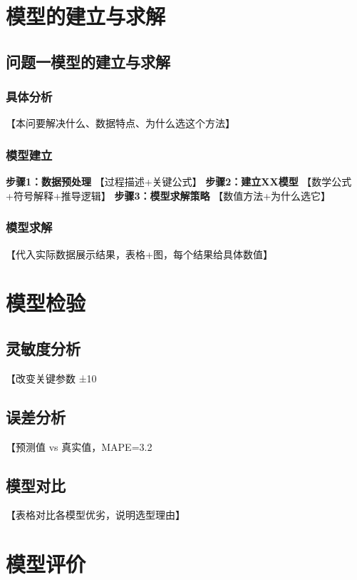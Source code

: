 \section{模型的建立与求解}

% 
% 

\subsection{问题一模型的建立与求解}
\subsubsection{具体分析}
【本问要解决什么、数据特点、为什么选这个方法】
\subsubsection{模型建立}
\textbf{步骤1：数据预处理}
【过程描述+关键公式】
\textbf{步骤2：建立XX模型}
【数学公式+符号解释+推导逻辑】
\textbf{步骤3：模型求解策略}
【数值方法+为什么选它】
\subsubsection{模型求解}
【代入实际数据展示结果，表格+图，每个结果给具体数值】

\section{模型检验}
\subsection{灵敏度分析}
【改变关键参数 ±10%
\subsection{误差分析}
【预测值 vs 真实值，MAPE=3.2%
\subsection{模型对比}  %
【表格对比各模型优劣，说明选型理由】

\section{模型评价}
